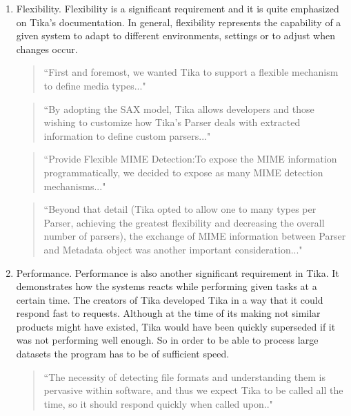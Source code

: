 \documentclass{article}
\begin{document}
\begin{enumerate}
    
    \item Flexibility. Flexibility is a significant requirement and it is quite emphasized on Tika's documentation. In general, flexibility represents the capability of a given system to adapt to different environments, settings or to adjust when changes occur.
    
    \begin{quote}
        ``First and foremost, we wanted Tika to support a flexible mechanism to define media types..."
    \end{quote}
    
    \begin{quote}
        ``By adopting the SAX model, Tika allows developers and those wishing to customize how Tika’s Parser deals with extracted information to define custom parsers..."
    \end{quote}
    
    \begin{quote}
        ``Provide Flexible MIME Detection:To expose the MIME information programmatically, we decided to expose as many MIME detection mechanisms..."
    \end{quote}
    
    \begin{quote}
        ``Beyond that detail (Tika opted to allow one to many types per Parser, achieving the greatest flexibility and decreasing the overall number of parsers), the exchange of MIME information between Parser and Metadata object was another important consideration..."
    \end{quote}
    \item Performance. Performance is also another significant requirement in Tika. It demonstrates how the systems reacts while performing given tasks at a certain time. The creators of Tika developed Tika in a way that it could respond fast to requests. Although at the time of its making not similar products might have existed, Tika would have been quickly superseded if it was not performing well enough. So in order to be able to process large datasets the program has to be of sufficient speed.
    
    \begin{quote}
        ``The necessity of detecting file formats and understanding them is pervasive within software, and thus we expect Tika to be called all the time, so it should respond quickly when called upon.."
    \end{quote}
    

\end{enumerate}
\end{document}
